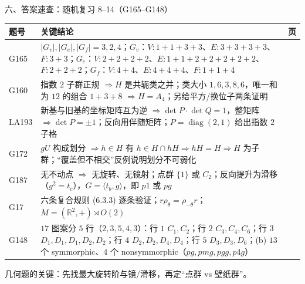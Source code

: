 \documentclass[aspectratio=169,10pt,fontset=none]{ctexbeamer}
\begin{document}
\begin{frame}[t]{六、答案速查：随机复习 8--14（G165--G148）}
  \centering
  \scriptsize
  \setlength{\tabcolsep}{3pt}
  \renewcommand{\arraystretch}{1.12}
  \begin{tabular}{@{}l p{9.9cm} c@{}}
    \toprule
    题号 & 关键结论 & 页\\
    \midrule
    G165 & $|G_v|,|G_e|,|G_f|=3,2,4$；$G_v$：$V:1+1+3+3$、$E:3+3+3+3$、$F:3+3$；$G_e$：$V:2+2+2+2$、$E:1+1+2+2+2+2+2$、$F:2+2+2$；$G_f$：$V:4+4$、$E:4+4+4$、$F:1+1+4$ & \pageref{ex:G165}\\
    G160 & 指数 $2$ 子群正规 $\Rightarrow H$ 是共轭类之并；类大小 $1,6,3,8,6$，唯一和为 $12$ 的组合 $1+3+8$ $\Rightarrow H=A_4$；另给平方/换位子两条证明 & \pageref{ex:G160}\\
    LA193 & 新基与旧基的坐标矩阵互为逆 $\Rightarrow\det P\cdot\det Q=1$，整矩阵 $\Rightarrow\det P=\pm1$；反向用伴随矩阵；$P=\operatorname{diag}(2,1)$ 给出指数 $2$ 子格 & \pageref{ex:LA193}\\
    G172 & $gU$ 构成划分 $\Rightarrow h\in H$ 有 $h\in H\cap hH\Rightarrow hH=H\Rightarrow H$ 为子群；“覆盖但不相交”反例说明划分不可弱化 & \pageref{ex:G172}\\
    G187 & 无不动点 $\Rightarrow$ 无旋转、无镜射；点群 $\{1\}$ 或 $C_2$；反向提升为滑移（$g^2=t_c$），$G=\langle t_b,g\rangle$，即 $p1$ 或 $pg$ & \pageref{ex:G187}\\
    G17 & 六条复合规则 (6.3.3) 逐条验证；$r\rho_\theta=\rho_{-\theta}r$；$M=(\mathbb R^2,+)\rtimes O(2)$ & \pageref{ex:G17}\\
    G148 & $17$ 图案分 $5$ 行（$2,3,5,4,3$）：行 $1$ $C_1,C_2$；行 $2$ $C_3,C_4,C_6$；行 $3$ $D_1,D_1,D_1,D_2,D_2$；行 $4$ $D_2,D_2,D_4,D_4$；行 $5$ $D_3,D_3,D_6$；(b) $13$ 个 symmorphic、$4$ 个 nonsymmorphic（$pg,pmg,pgg,p4g$） & \pageref{ex:G148}\\
    \bottomrule
  \end{tabular}
  \par
  \vspace{0.3em}
  {\scriptsize\color{ink!70} 几何题的关键：先找最大旋转阶与镜/滑移，再定“点群 vs 壁纸群”。}
\end{frame}
\end{document}
